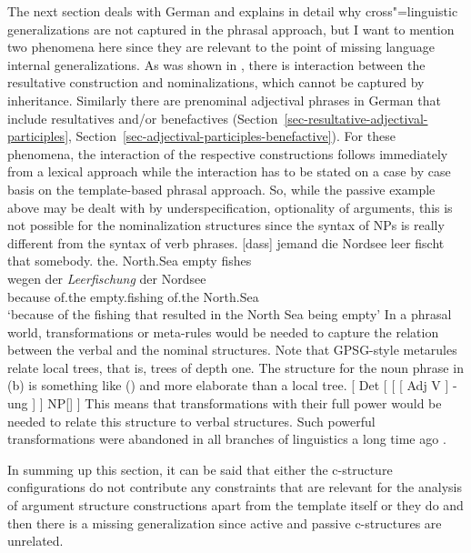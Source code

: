 The next section deals with German and explains in detail why cross"=linguistic generalizations are not
captured in the phrasal approach, but I want to mention two phenomena here since they are relevant
to the point of missing language internal generalizations. As was shown in , there is interaction between the resultative construction and nominalizations, which
cannot be captured by inheritance. Similarly there are prenominal adjectival phrases in German that
include resultatives and/or benefactives (Section~\ref{sec-resultative-adjectival-participles},
Section~\ref{sec-adjectival-participles-benefactive}). For these phenomena, the interaction of the
respective constructions follows immediately from a lexical approach while the interaction has to be stated on a case by case basis
on the template-based phrasal approach. So, while the passive example above may be dealt with by
underspecification, \eg optionality of arguments, this is not possible for the nominalization
structures since the syntax of NPs is really different from the syntax of verb phrases. 
\eal
\ex 
\gll {}[dass] jemand die Nordsee leer fischt\\
	 {}\spacebr{}that somebody.\nom{} the.\acc{} North.Sea empty fishes\\
\ex\label{bsp-leerfischung}
\gll wegen   der \emph{Leerfischung}  der    Nordsee\footnotemark\\
     because of.the empty.fishing of.the North.Sea\\
\glt `because of the fishing that resulted in the North Sea being empty'
\zl
In a phrasal world, transformations or meta-rules would be needed to capture the relation between the verbal and
the nominal structures. Note that GPSG-style metarules relate local trees, that is, trees of depth
one. The structure for the noun phrase in (b) is something like () and more elaborate
than a local tree. 
\ea
{}[ Det [ [ [ Adj V ] -ung ] ] NP[] ]
\z
This means that
transformations with their full power would be needed to relate this structure to verbal
structures. Such powerful transformations were abandoned in all branches of linguistics a long
time ago \citep{Chomsky81a}.



In summing up this section, it can be said that either the c-structure configurations do not
contribute any constraints that are relevant for the analysis of argument structure constructions
apart from the  template itself or they do and then there is a missing
generalization since active and passive c-structures are unrelated.

